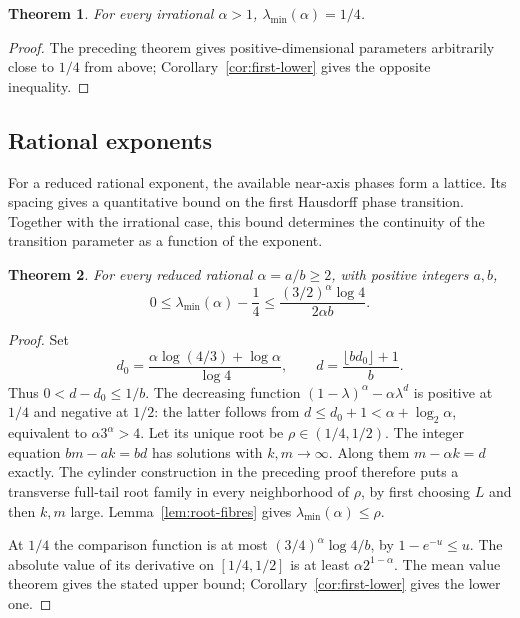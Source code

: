 \documentclass[11pt,a4paper]{amsart}
\numberwithin{equation}{section}
\newtheorem{theorem}{Theorem}[section]
\theoremstyle{definition}
\begin{document}
\begin{theorem}\label{thm:irrational-onset}
For every irrational \(\alpha>1\), \(\lambda_{\min}(\alpha)=1/4\).
\end{theorem}
\begin{proof}
The preceding theorem gives positive-dimensional parameters
arbitrarily close to \(1/4\) from above; Corollary~\ref{cor:first-lower}
gives the opposite inequality.
\end{proof}

\subsection{Rational exponents}
\label{subsec:rational-continuity}

For a reduced rational exponent, the available near-axis phases
form a lattice. Its spacing gives a quantitative bound on the first
Hausdorff phase transition. Together with the irrational case, this
bound determines the continuity of the transition parameter as a
function of the exponent.

\begin{theorem}\label{thm:denominator}
For every reduced rational \(\alpha=a/b\geq2\), with positive integers
\(a,b\),
\[
0\leq\lambda_{\min}(\alpha)-\frac14
\leq\frac{(3/2)^\alpha\log4}{2\alpha b}.
\]
\end{theorem}
\begin{proof}
Set
\[
d_0=\frac{\alpha\log(4/3)+\log \alpha}{\log4},
\qquad d=\frac{\lfloor bd_0\rfloor+1}{b}.
\]
Thus \(0<d-d_0\leq1/b\). The decreasing function
\((1-\lambda)^\alpha-\alpha\lambda^d\) is positive at \(1/4\) and negative
at \(1/2\): the latter follows from
\(d\leq d_0+1<\alpha+\log_2 \alpha\), equivalent to \(\alpha3^\alpha>4\).
Let its unique root be \(\rho\in(1/4,1/2)\).
The integer equation \(bm-ak=bd\) has solutions with
\(k,m\to\infty\). Along them \(m-\alpha k=d\) exactly.
The cylinder construction in the preceding proof therefore puts
a transverse full-tail root family in every neighborhood of
\(\rho\), by first choosing \(L\) and then \(k,m\) large.
Lemma~\ref{lem:root-fibres} gives \(\lambda_{\min}(\alpha)\leq\rho\).

At \(1/4\) the comparison function is at most
\((3/4)^\alpha\log4/b\), by \(1-e^{-u}\leq u\).
The absolute value of its derivative on \([1/4,1/2]\) is at least
\(\alpha2^{1-\alpha}\). The mean value theorem gives the stated upper
bound; Corollary~\ref{cor:first-lower} gives the lower one.
\end{proof}
\end{document}

